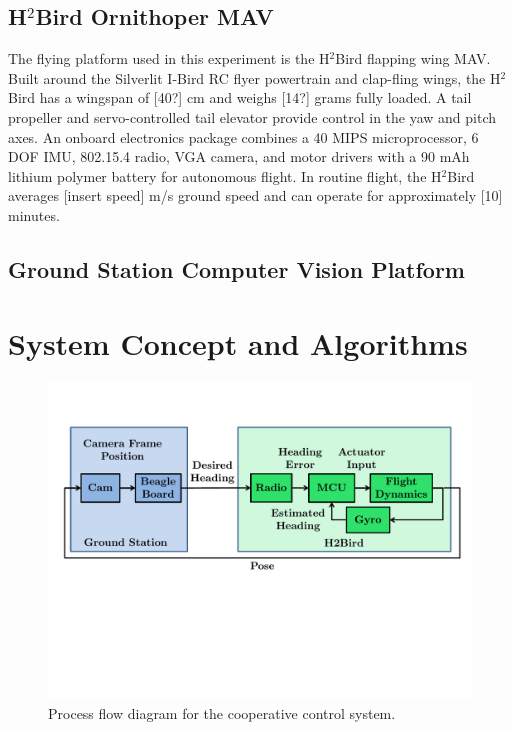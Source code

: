\documentclass{aamas2013}
\begin{document}
\subsection{H$^2$Bird Ornithoper MAV}
The flying platform used in this experiment is the H$^2$Bird flapping wing MAV. Built around the Silverlit I-Bird RC flyer powertrain and clap-fling wings, the H$^2$Bird has a wingspan of [40?] cm and weighs [14?] grams fully loaded. A tail propeller and servo-controlled tail elevator provide control in the yaw and pitch axes. An onboard electronics package combines a 40 MIPS microprocessor, 6 DOF IMU, 802.15.4 radio, VGA camera, and motor drivers with a 90 mAh lithium polymer battery for autonomous flight. In routine flight, the H$^2$Bird averages [insert speed] m/s ground speed and can operate for approximately [10] minutes.

\subsection{Ground Station Computer Vision Platform}


\section{System Concept and Algorithms}

\begin{figure}[tb]
\centering
\includegraphics[width=\linewidth]{figures/process_flow.pdf}
\caption{Process flow diagram for the cooperative control system.}
\label{fig:process_flow}
\end{figure}
\end{document}
